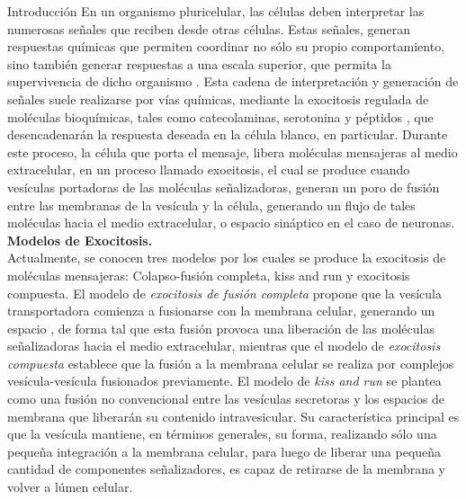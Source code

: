 \documentclass[twocolumn]{article}
\makeatletter
\def\section{\@startsection {section}{1}{\z@}{24pt plus 2pt minus 2pt}
{12pt plus 2pt minus 2pt}{\large\bf}}
\makeatother
\begin{document}
\section{Introducción}
En un organismo pluricelular, las células deben interpretar las numerosas señales que reciben desde otras células\citep{alberts2006introduccion}. Estas señales, generan respuestas químicas que permiten coordinar no sólo su propio comportamiento, sino también generar respuestas a una escala superior, que permita la supervivencia de dicho organismo \citep{jarukanont2015vesicle}.
Esta cadena de interpretación y generación de señales suele realizarse por vías químicas, mediante la exocitosis regulada de moléculas bioquímicas\citep{evanko2005primer, aspinwall1999comparison}, tales como catecolaminas, serotonina y péptidos \citep{mosharov2005analysis}, que desencadenarán la respuesta deseada en la célula blanco, en particular.
Durante este proceso, la célula que porta el mensaje, libera moléculas mensajeras  al medio extracelular, en un proceso llamado exocitosis\citep{gonzalez2010association}, el cual se produce cuando vesículas portadoras de las moléculas señalizadoras, generan un poro de fusión entre las membranas de la vesícula y la célula\citep{amatore2009quantitative,oleinick2013vesicular}, generando un flujo de tales moléculas hacia el medio extracelular, o espacio sináptico en el caso de neuronas.\\
{\bf Modelos de Exocitosis.\\}
Actualmente, se conocen tres modelos por los cuales se produce la exocitosis de moléculas mensajeras: Colapso-fusión completa, kiss and run y exocitosis compuesta.  
El modelo de \textit{exocitosis de fusión completa} propone que la vesícula transportadora comienza a fusionarse con la membrana celular, generando un espacio , de forma tal que esta fusión provoca una liberación de las moléculas señalizadoras hacia el medio extracelular, mientras que el modelo de \textit{exocitosis compuesta} establece que la fusión a la membrana celular se realiza por complejos vesícula-vesícula fusionados previamente\citep{wu2014exocytosis}.  
El modelo de \textit{kiss and run} se plantea como una fusión no convencional entre las vesículas secretoras y los espacios de membrana que liberarán su contenido intravesicular. Su característica principal es que la vesícula mantiene, en términos generales, su forma, realizando sólo una pequeña integración a la membrana celular, para luego de liberar una pequeña cantidad de componentes señalizadores, es capaz de retirarse de la membrana y volver a lúmen celular\citep{alabi2013perspectives}.\\
\end{document}
